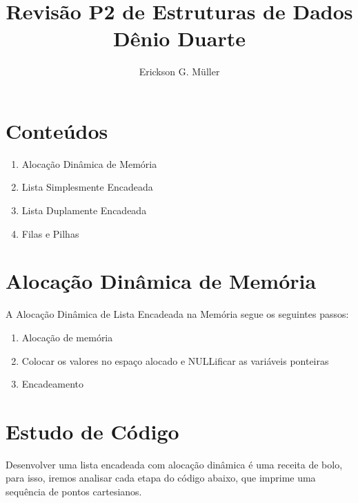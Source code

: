 \documentclass[ ]{article}
\title{Revisão P2 de Estruturas de Dados \\ Dênio Duarte}
\author{Erickson G. Müller}
\begin{document}


\maketitle

\section{Conteúdos}
\begin{enumerate}
	\item Alocação Dinâmica de Memória
	\item Lista Simplesmente Encadeada
	\item Lista Duplamente Encadeada
	\item Filas e Pilhas
\end{enumerate}
\pagebreak
\section{Alocação Dinâmica de Memória}
	A Alocação Dinâmica de Lista Encadeada na Memória segue os seguintes passos:
	\begin{enumerate}
		\item Alocação de memória
		\item Colocar os valores no espaço alocado e NULLificar as variáveis ponteiras
		\item Encadeamento
	\end{enumerate}
\section{Estudo de Código}
	Desenvolver uma lista encadeada com alocação dinâmica é uma receita de bolo, para isso, iremos analisar cada etapa do código abaixo, que imprime uma sequência de pontos cartesianos.
	
\end{document}
